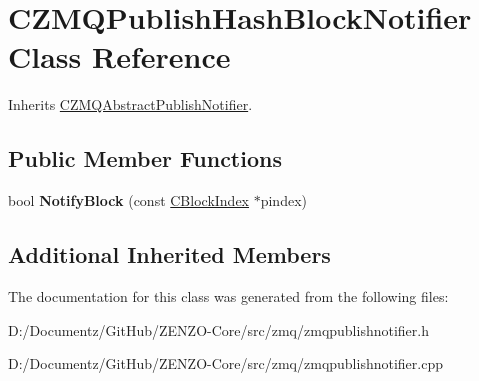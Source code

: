 \hypertarget{class_c_z_m_q_publish_hash_block_notifier}{}\section{C\+Z\+M\+Q\+Publish\+Hash\+Block\+Notifier Class Reference}
\label{class_c_z_m_q_publish_hash_block_notifier}


Inherits \mbox{\hyperlink{class_c_z_m_q_abstract_publish_notifier}{C\+Z\+M\+Q\+Abstract\+Publish\+Notifier}}.

\subsection*{Public Member Functions}
\begin{DoxyCompactItemize}
\item 
\mbox{\label{class_c_z_m_q_publish_hash_block_notifier_ac40147fa0fcbbd7ab755b599b0a9c900}} 
bool {\bfseries Notify\+Block} (const \mbox{\hyperlink{class_c_block_index}{C\+Block\+Index}} $\ast$pindex)
\end{DoxyCompactItemize}
\subsection*{Additional Inherited Members}


The documentation for this class was generated from the following files\+:\begin{DoxyCompactItemize}
\item 
D\+:/\+Documentz/\+Git\+Hub/\+Z\+E\+N\+Z\+O-\/\+Core/src/zmq/zmqpublishnotifier.\+h\item 
D\+:/\+Documentz/\+Git\+Hub/\+Z\+E\+N\+Z\+O-\/\+Core/src/zmq/zmqpublishnotifier.\+cpp\end{DoxyCompactItemize}

